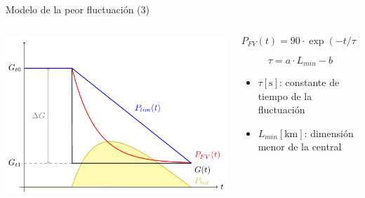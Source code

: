\documentclass[aspectratio=169, usenames,svgnames,dvipsnames]{beamer}
\begin{document}
\begin{frame}[label={sec:org5155cd0}]{Modelo de la peor fluctuación (3)}
\begin{columns}
\begin{column}{0.4\columnwidth}
\begin{center}
\includegraphics[width=\textwidth]{../figs/ModeloPeorFluctuacion.pdf}
\end{center}
\end{column}

\begin{column}{0.6\columnwidth}
\[
  P_{FV}(t) = 90 \cdot \exp(-t/\tau) + 10
\]

\[
  \tau = a \cdot L_{min} - b
\]

\begin{itemize}
\item \(\tau [\unit{\second}]\): constante de tiempo de la fluctuación
\item \(L_{min} [\unit{\kilo\meter}]\): dimensión menor de la central
\end{itemize}
\end{column}
\end{columns}
\end{frame}
\end{document}
